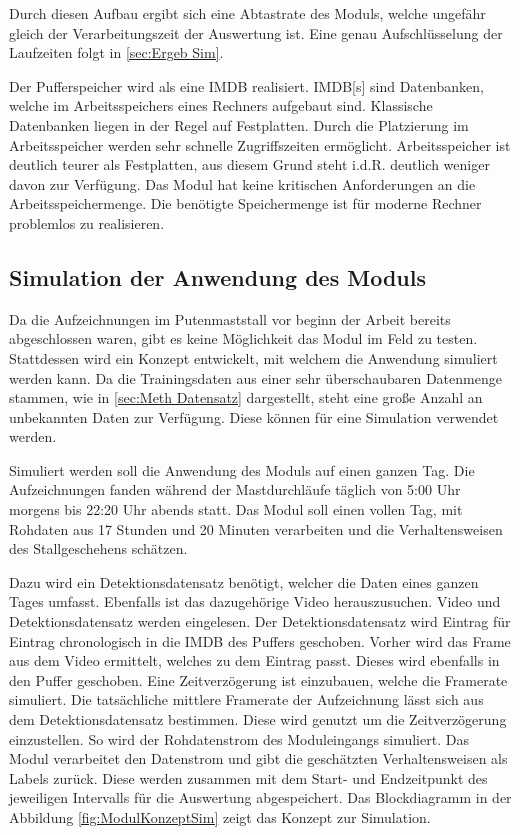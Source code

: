 Durch diesen Aufbau ergibt sich eine Abtastrate des Moduls, welche ungefähr gleich der Verarbeitungszeit der Auswertung ist. Eine genau Aufschlüsselung der Laufzeiten folgt in \ref{sec:Ergeb Sim}. \par

Der Pufferspeicher wird als eine \gls{IMDB} realisiert. \gls{IMDB}[s] sind Datenbanken, welche im Arbeitsspeichers eines Rechners aufgebaut sind. Klassische Datenbanken liegen in der Regel auf Festplatten. Durch die Platzierung im Arbeitsspeicher werden sehr schnelle Zugriffszeiten ermöglicht. Arbeitsspeicher ist deutlich teurer als Festplatten, aus diesem Grund steht i.d.R. deutlich weniger davon zur Verfügung. Das Modul hat keine kritischen Anforderungen an die Arbeitsspeichermenge. Die benötigte Speichermenge ist für moderne Rechner problemlos zu realisieren. \par


\subsection{Simulation der Anwendung des Moduls} \label{sec:Meth Sim}
Da die Aufzeichnungen im Putenmaststall vor beginn der Arbeit bereits abgeschlossen waren, gibt es keine Möglichkeit das Modul im Feld zu testen. Stattdessen wird ein Konzept entwickelt, mit welchem die Anwendung simuliert werden kann. Da die Trainingsdaten aus einer sehr überschaubaren Datenmenge stammen, wie in \ref{sec:Meth Datensatz} dargestellt, steht eine große Anzahl an unbekannten Daten zur Verfügung. Diese können für eine Simulation verwendet werden. \par

Simuliert werden soll die Anwendung des Moduls auf einen ganzen Tag. Die Aufzeichnungen fanden während der Mastdurchläufe täglich von 5:00 Uhr morgens bis 22:20 Uhr abends statt. Das Modul soll einen vollen Tag, mit Rohdaten aus 17 Stunden und 20 Minuten verarbeiten und die Verhaltensweisen des Stallgeschehens schätzen.\par

Dazu wird ein Detektionsdatensatz benötigt, welcher die Daten eines ganzen Tages umfasst. Ebenfalls ist das dazugehörige Video herauszusuchen. Video und Detektionsdatensatz werden eingelesen. Der Detektionsdatensatz wird Eintrag für Eintrag chronologisch in die \gls{IMDB} des Puffers geschoben. Vorher wird das Frame aus dem Video ermittelt, welches zu dem Eintrag passt. Dieses wird ebenfalls in den Puffer geschoben. Eine Zeitverzögerung ist einzubauen, welche die Framerate simuliert. Die tatsächliche mittlere Framerate der Aufzeichnung lässt sich aus dem Detektionsdatensatz bestimmen. Diese wird genutzt um die Zeitverzögerung einzustellen. So wird der Rohdatenstrom des Moduleingangs simuliert. Das Modul verarbeitet den Datenstrom und gibt die geschätzten Verhaltensweisen als Labels zurück. Diese werden zusammen mit dem Start- und Endzeitpunkt des jeweiligen Intervalls für die Auswertung abgespeichert. Das Blockdiagramm in der Abbildung \ref{fig:ModulKonzeptSim} zeigt das Konzept zur Simulation. 

